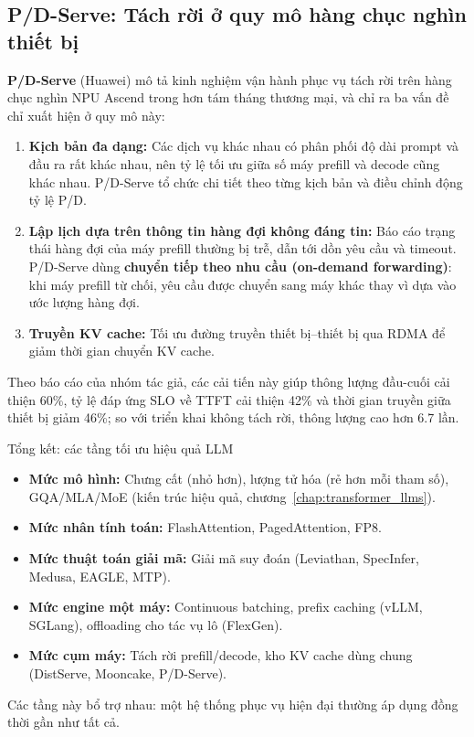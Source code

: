\subsection{P/D-Serve: Tách rời ở quy mô hàng chục nghìn thiết bị}
\label{ssec:pdserve}
\textbf{P/D-Serve} \cite{jin2024pdserve} (Huawei) mô tả kinh nghiệm vận hành phục vụ tách rời trên hàng chục nghìn NPU Ascend trong hơn tám tháng thương mại, và chỉ ra ba vấn đề chỉ xuất hiện ở quy mô này:
\begin{enumerate}
	\item \textbf{Kịch bản đa dạng:} Các dịch vụ khác nhau có phân phối độ dài prompt và đầu ra rất khác nhau, nên tỷ lệ tối ưu giữa số máy prefill và decode cũng khác nhau. P/D-Serve tổ chức chi tiết theo từng kịch bản và điều chỉnh động tỷ lệ P/D.
	\item \textbf{Lập lịch dựa trên thông tin hàng đợi không đáng tin:} Báo cáo trạng thái hàng đợi của máy prefill thường bị trễ, dẫn tới dồn yêu cầu và timeout. P/D-Serve dùng \textbf{chuyển tiếp theo nhu cầu (on-demand forwarding)}: khi máy prefill từ chối, yêu cầu được chuyển sang máy khác thay vì dựa vào ước lượng hàng đợi.
	\item \textbf{Truyền KV cache:} Tối ưu đường truyền thiết bị--thiết bị qua RDMA để giảm thời gian chuyển KV cache.
\end{enumerate}
Theo báo cáo của nhóm tác giả, các cải tiến này giúp thông lượng đầu-cuối cải thiện 60\%, tỷ lệ đáp ứng SLO về TTFT cải thiện 42\% và thời gian truyền giữa thiết bị giảm 46\%; so với triển khai không tách rời, thông lượng cao hơn 6.7 lần.

\begin{assess}{Tổng kết: các tầng tối ưu hiệu quả LLM}
\begin{itemize}
	\item \textbf{Mức mô hình:} Chưng cất (nhỏ hơn), lượng tử hóa (rẻ hơn mỗi tham số), GQA/MLA/MoE (kiến trúc hiệu quả, chương~\ref{chap:transformer_llms}).
	\item \textbf{Mức nhân tính toán:} FlashAttention, PagedAttention, FP8.
	\item \textbf{Mức thuật toán giải mã:} Giải mã suy đoán (Leviathan, SpecInfer, Medusa, EAGLE, MTP).
	\item \textbf{Mức engine một máy:} Continuous batching, prefix caching (vLLM, SGLang), offloading cho tác vụ lô (FlexGen).
	\item \textbf{Mức cụm máy:} Tách rời prefill/decode, kho KV cache dùng chung (DistServe, Mooncake, P/D-Serve).
\end{itemize}
Các tầng này bổ trợ nhau: một hệ thống phục vụ hiện đại thường áp dụng đồng thời gần như tất cả.
\end{assess}

